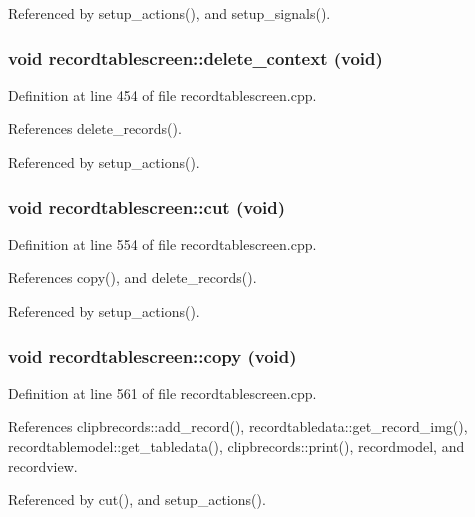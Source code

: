 Referenced by setup\_\-actions(), and setup\_\-signals().
\subsubsection{\setlength{\rightskip}{0pt plus 5cm}void recordtablescreen::delete\_\-context (void)\hspace{0.3cm}{\tt  [private, slot]}}\label{classrecordtablescreen_7112dde2ef63a21504b91061c6facd88}




Definition at line 454 of file recordtablescreen.cpp.

References delete\_\-records().

Referenced by setup\_\-actions().
\subsubsection{\setlength{\rightskip}{0pt plus 5cm}void recordtablescreen::cut (void)\hspace{0.3cm}{\tt  [private, slot]}}\label{classrecordtablescreen_ff66fb349cc313a39b880a6a24d3a48f}




Definition at line 554 of file recordtablescreen.cpp.

References copy(), and delete\_\-records().

Referenced by setup\_\-actions().
\subsubsection{\setlength{\rightskip}{0pt plus 5cm}void recordtablescreen::copy (void)\hspace{0.3cm}{\tt  [private, slot]}}\label{classrecordtablescreen_b955b96193163a47680f3331c65a80e9}




Definition at line 561 of file recordtablescreen.cpp.

References clipbrecords::add\_\-record(), recordtabledata::get\_\-record\_\-img(), recordtablemodel::get\_\-tabledata(), clipbrecords::print(), recordmodel, and recordview.

Referenced by cut(), and setup\_\-actions().
